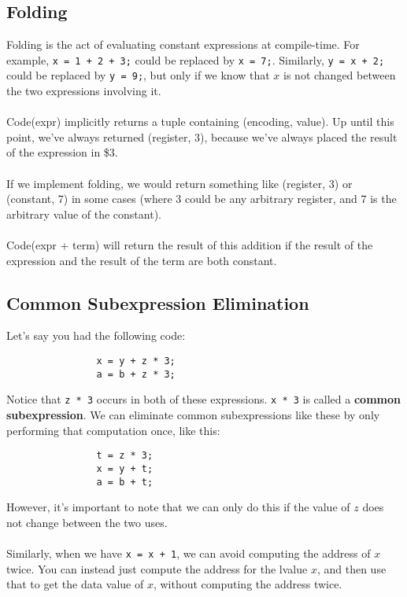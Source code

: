 \documentclass[]{article}
\theoremstyle{definition}
\begin{document}
		\subsection{Folding}
			Folding is the act of evaluating constant expressions at compile-time. For example, \verb|x = 1 + 2 + 3;| could be replaced by \verb|x = 7;|. Similarly, \verb|y = x + 2;| could be replaced by \verb|y = 9;|, but only if we know that $x$ is not changed between the two expressions involving it.
			\\ \\
			Code(expr) implicitly returns a tuple containing (encoding, value). Up until this point, we've always returned (register, 3), because we've always placed the result of the expression in \$3. 
			\\ \\
			If we implement folding, we would return something like (register, 3) or (constant, 7) in some cases (where 3 could be any arbitrary register, and 7 is the arbitrary value of the constant).
			\\ \\
			Code(expr + term) will return the result of this addition if the result of the expression and the result of the term are both constant.
			
		\subsection{Common Subexpression Elimination}
			Let's say you had the following code:
			\begin{verbatim}
				x = y + z * 3;
				a = b + z * 3;
			\end{verbatim}
		
			Notice that \verb+z * 3+ occurs in both of these expressions. \verb+x * 3+ is called a \textbf{common subexpression}. We can eliminate common subexpressions like these by only performing that computation once, like this:
			\begin{verbatim}
				t = z * 3;
				x = y + t;
				a = b + t;
			\end{verbatim}
		
			However, it's important to note that we can only do this if the value of $z$ does not change between the two uses.
			\\ \\
			Similarly, when we have \verb|x = x + 1|, we can avoid computing the address of $x$ twice. You can instead just compute the address for the lvalue $x$, and then use that to get the data value of $x$, without computing the address twice.
		
\end{document}
